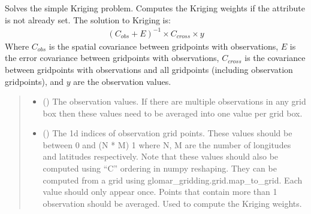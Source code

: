 \documentclass[letterpaper,10pt,english]{sphinxmanual}
\begin{document}
\begin{fulllineitems}
\begin{fulllineitems}
\label{\detokenize{kriging:glomar_gridding.kriging.SimpleKriging.solve}}
\pysigstartsignatures
\pysiglinewithargsret
{}
{\sphinxparamcomma {}\sphinxparamcomma {}\sphinxparamcomma {}}
{}
\pysigstopsignatures
\sphinxAtStartPar
Solves the simple Kriging problem. Computes the Kriging weights if the
 attribute is not already set. The solution to Kriging
is:
\begin{equation*}
\begin{split}(C_{obs} + E)^{-1} \times C_{cross} \times y\end{split}
\end{equation*}
\sphinxAtStartPar
Where \(C_{obs}\) is the spatial covariance between grid\sphinxhyphen{}points
with observations, \(E\) is the error covariance between grid\sphinxhyphen{}points
with observations, \(C_{cross}\) is the covariance between
grid\sphinxhyphen{}points with observations and all grid\sphinxhyphen{}points (including observation
grid\sphinxhyphen{}points), and \(y\) are the observation values.
\begin{quote}\begin{description}
\begin{itemize}
\item {}
\sphinxAtStartPar
{} () \textendash{} The observation values. If there are multiple observations in any
grid box then these values need to be averaged into one value per
grid box.

\item {}
\sphinxAtStartPar
{} () \textendash{} The 1d indices of observation grid points. These values should be
between 0 and (N * M) \sphinxhyphen{} 1 where N, M are the number of longitudes
and latitudes respectively. Note that these values should also be
computed using “C” ordering in numpy reshaping. They can be
computed from a grid using glomar\_gridding.grid.map\_to\_grid. Each
value should only appear once. Points that contain more than 1
observation should be averaged. Used to compute the Kriging weights.


\end{itemize}
\end{description}
\end{quote}
\end{fulllineitems}
\end{fulllineitems}
\end{document}
